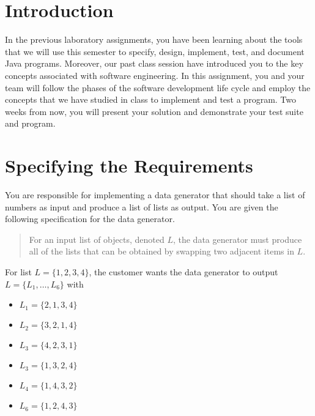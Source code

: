 

\usepackage[compact]{titlesec}



\section*{Introduction}

In the previous laboratory assignments, you have been learning about the tools that we will use this semester to
specify, design, implement, test, and document Java programs. Moreover, our past class session have introduced you to
the key concepts associated with software engineering.  In this assignment, you and your team will follow the phases of
the software development life cycle and employ the concepts that we have studied in class  to implement and test a
program. Two weeks from now, you will present your solution and demonstrate your test suite and program.

\section*{Specifying the Requirements}

You are responsible for implementing a data generator that should take a list of numbers as input and produce a list of
lists as output.  You are given the following specification for the data generator.

\begin{quote}
For an input list of objects, denoted $L$, the data generator must produce all of the lists that can be obtained by swapping two
adjacent items in $L$.
\end{quote} 	     

\noindent
For list $L = \{1, 2, 3, 4\}$, the customer wants the data generator to output $L=\{L_1, \ldots, L_6\}$ with 

\begin{itemize}
	\item[] $L_1 = \{2, 1, 3, 4\}$
	\item[] $L_2 = \{3, 2, 1, 4\}$
	\item[] $L_3 = \{4, 2, 3, 1\}$
	\item[] $L_3 = \{1, 3, 2, 4\}$
	\item[] $L_4 = \{1, 4, 3, 2\}$
	\item[] $L_6 = \{1, 2, 4, 3\}$
\end{itemize} 

